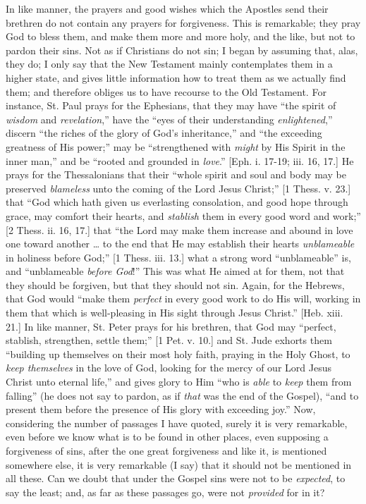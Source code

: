 In like manner, the prayers and good wishes which the Apostles send
their brethren do not contain any prayers for forgiveness. This is
remarkable; they pray God to bless them, and make them more and more
holy, and the like, but not to pardon their sins. Not as if Christians
do not sin; I began by assuming that, alas, they do; I only say that
the New Testament mainly contemplates them in a higher state, and
gives little information how to treat them as we actually find them;
and therefore obliges us to have recourse to the Old Testament. For
instance, St. Paul prays for the Ephesians, that they may have
``the spirit of \emph{wisdom} and \emph{revelation},'' have
the ``eyes of their understanding \emph{enlightened},''
discern ``the riches of the glory of God's inheritance,'' and
``the exceeding greatness of His power;'' may be
``strengthened with \emph{might} by His Spirit in the inner
man,'' and be ``rooted and grounded in \emph{love}.''
[Eph. i. 17-19; iii. 16, 17.] He prays for the Thessalonians that
their ``whole spirit and soul and body may be preserved \emph{blameless}
unto the coming of the Lord Jesus Christ;'' [1 Thess. v. 23.] that
``God which hath given us everlasting consolation, and good hope
through grace, may comfort their hearts, and \emph{stablish} them in
every good word and work;'' [2 Thess. ii. 16, 17.] that ``the
Lord may make them increase and abound in love one toward another …
to the end that He may establish their hearts \emph{unblameable} in
holiness before God;'' [1 Thess. iii. 13.] what a strong word
``unblameable'' is, and ``unblameable \emph{before God}!''
This was what He aimed at for them, not that they should be forgiven,
but that they should not sin. Again, for the Hebrews, that God would
``make them \emph{perfect} in every good work to do His will,
working in them that which is well-pleasing in His sight through Jesus
Christ.'' [Heb. xiii. 21.] In like manner, St. Peter prays for his
brethren, that God may ``perfect, stablish, strengthen, settle
them;'' [1 Pet. v. 10.] and St. Jude exhorts them ``building
up themselves on their most holy faith, praying in the Holy Ghost, to \emph{keep
themselves} in the love of God, looking for the mercy of our Lord
Jesus Christ unto eternal life,'' and gives glory to Him ``who
is \emph{able} to \emph{keep} them from falling'' (he does not say
to pardon, as if \emph{that} was the end of the Gospel), ``and to
present them before the presence of His glory with exceeding
joy.'' Now, considering the number of passages I have quoted,
surely it is very remarkable, even before we know what is to be found
in other places, even supposing a forgiveness of sins, after the one
great forgiveness and like it, is mentioned somewhere else, it is very
remarkable (I say) that it should not be mentioned in all these. Can
we doubt that under the Gospel sins were not to be \emph{expected}, to
say the least; and, as far as these passages go, were not \emph{provided}
for in it?

